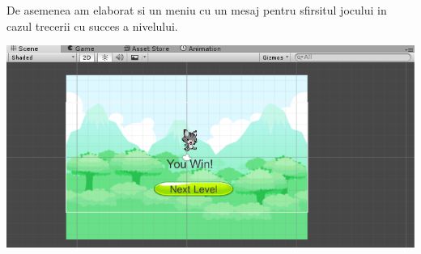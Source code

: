 De asemenea am elaborat si un meniu cu un mesaj pentru sfirsitul jocului in cazul trecerii cu succes a nivelului.
\begin{center}
\includegraphics[scale=1]{images/win}\\
\end{center}
\clearpage